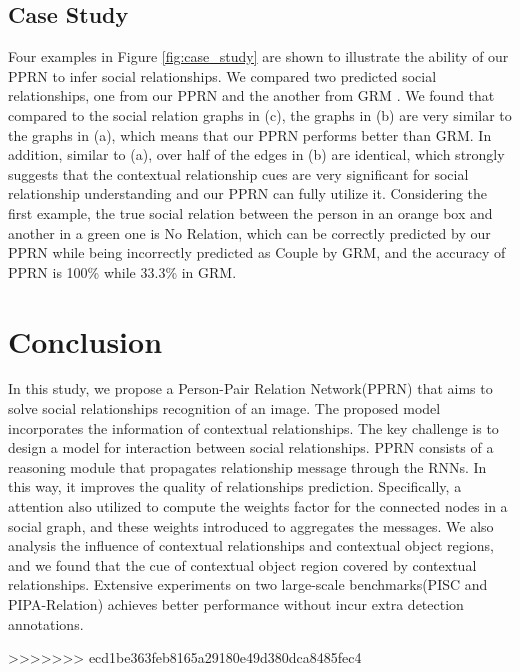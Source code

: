 \documentclass{article}
\newcommand{\PPRN}{{\sf PPRN}}
\begin{document}

\subsection{Case Study}\label{section:cs}

Four examples in Figure \ref{fig:case_study} are shown to illustrate the ability of our {\PPRN} to infer social relationships. We compared two predicted social relationships, one from our {\PPRN} and the another from GRM \cite{DBLP:conf/ijcai/WangCRYCL18}. We found that compared to the social relation graphs in (c), the graphs in (b) are very similar to the graphs in (a), which means that our {\PPRN} performs better than GRM. In addition, similar to (a), over half of the edges in (b) are identical, which strongly suggests that the contextual relationship cues are very significant for social relationship understanding and our {\PPRN} can fully utilize it. Considering the first example, the true social relation between the person in an orange box and another in a green one is No Relation, which can be correctly predicted by our {\PPRN} while being incorrectly predicted as Couple by GRM, and the accuracy of {\PPRN} is 100\% while 33.3\% in GRM.

\section{Conclusion}
In this study, we propose a Person-Pair Relation Network(\PPRN) that aims to solve social relationships recognition of an image. The proposed model incorporates the information of contextual relationships. The key challenge is to design a model for interaction between social relationships. {\PPRN} consists of a reasoning module that propagates relationship message through the RNNs. In this way, it improves the quality of relationships prediction. Specifically, a attention also utilized to compute the weights factor for the connected nodes in a social graph, and these weights introduced to aggregates the messages. We also analysis the influence of contextual relationships and contextual object regions, and we found that the cue of contextual object region covered by contextual relationships. Extensive experiments on two large-scale benchmarks(PISC and PIPA-Relation) achieves better performance  without incur extra detection annotations.

\newpage



>>>>>>> ecd1be363feb8165a29180e49d380dca8485fec4
\end{document}
